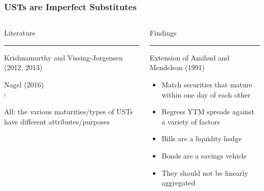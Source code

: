 \documentclass[11pt, handout, aspectratio=169]{beamer}
\newenvironment{wideitemize}{\itemize\addtolength{\itemsep}{10pt}}{\enditemize}
\begin{document}
\begin{frame}
	\label{slide:UST_Market}
	\frametitle{USTs are Imperfect Substitutes}
	\vspace{-2em}
	\begin{columns}[t]
		\begin{column}{0.49\textwidth}
			\begin{center}
				\Large \textcolor{WeberPurple}{Literature}
			\end{center} \vspace{-.2in}
			{\color{WeberPurple}\rule{\linewidth}{2pt}}
			\begin{wideitemize}
				\item Krishnamurthy and Vissing-Jorgensen (2012, 2013)
				\item Nagel (2016) \\ $\vdots$
				\item All: the various maturities/types of USTs have different attributes/purposes
			\end{wideitemize}
		\end{column}
		\hfill
		\begin{column}{0.49\textwidth}
			\begin{center}
				\Large \textcolor{WeberPurple}{Findings}
			\end{center} \vspace{-.2in}
			{\color{WeberPurple}\rule{\linewidth}{2pt}}
			\begin{wideitemize}
				\item Extension of Amihud and Mendelson (1991)
				\begin{itemize}
					\item Match securities that mature within one day of each other
					\item Regress YTM spreads against a variety of factors
				\end{itemize}
				\item {\bf \color{WeberPurple}{Contribution}}
				\begin{itemize}
					\item Bills are a liquidity hedge
					\item Bonds are a savings vehicle
					\item They should not be linearly aggregated 
				\end{itemize}
			\end{wideitemize}
		\end{column}
	\end{columns}
	\vfill
	\hfill \hyperlink{slide:Model}{}
\end{frame}
\end{document}
